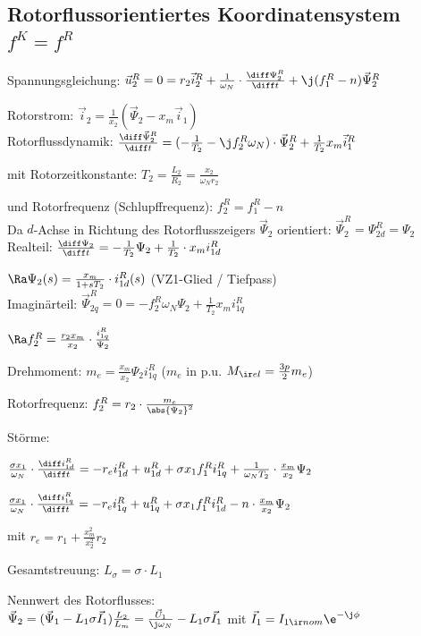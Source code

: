 \documentclass[german]{latex4ei_fs}
\begin{document}
\begin{sectionbox}
\subsection{Rotorflussorientiertes Koordinatensystem $f^K = f^R$}


Spannungsgleichung:
$\vec u_2^R = 0 = r_2 \vec i_2^R + \frac{1}{\omega_N} \cdot \frac{\diff \Psi_2^R}{\diff t} + \j (f_1^R - n) \vec \Psi_2^R$

Rotorstrom:
$\vec i_2 = \frac{1}{x_2} (\vec \Psi_2 - x_m \vec i_1)$ \\

Rotorflussdynamik:
$\frac{\diff \vec \Psi_2^R}{\diff t} = (- \frac{1}{T_2} - \j f_2^R \omega_N) \cdot \vec \Psi_2^R + \frac{1}{T_2} x_m \vec i_1^R$

mit Rotorzeitkonstante: $T_2 = \frac{L_2}{R_2} = \frac{x_2}{\omega_N r_2}$

und Rotorfrequenz (Schlupffrequenz): $f_2^R = f_1^R - n$ \\

Da $d$-Achse in Richtung des Rotorflusszeigers $\vec \Psi_2$ orientiert:
$\vec \Psi_2^R = \Psi_{2d}^R = \Psi_2$ \\

Realteil:
$\frac{\diff \Psi_2}{\diff t} = - \frac{1}{T_2} \Psi_2 + \frac{1}{T_2} \cdot x_m i_{1d}^R$

$\Ra \Psi_2(s) = \frac{x_m}{1 + s T_2} \cdot i_{1d}^R (s)$ (VZ1-Glied / Tiefpass) \\ 

Imaginärteil: 
$\vec \Psi_{2q}^R = 0 = - f_2^R \omega_N \Psi_2 + \frac{1}{T_2} x_m i_{1q}^R$

 $ \Ra f_2^R = \frac{r_2 x_m}{x_2} \cdot \frac{i_{1q}^R}{\Psi_2}$

 Drehmoment: $m_e = \frac{x_m}{x_2} \Psi_2 i_{1q}^R$ ($m_e$ in p.u. $M_{\ir el} = \frac{3p}{2} m_e$)

 Rotorfrequenz: $f_2^R = r_2 \cdot \frac{m_e}{\abs{\Psi_2}^2}$

Störme:

 $\frac{\sigma x_1}{\omega_N} \cdot \frac{\diff i_{1d}^R}{\diff t} = - r_e i_{1d}^R + u_{1d}^R + \sigma x_1 f_1^R i_{1q}^R + \frac{1}{\omega_N T_2} \cdot \frac{x_m}{x_2} \Psi_2$

  $\frac{\sigma x_1}{\omega_N} \cdot \frac{\diff i_{1q}^R}{\diff t} = - r_e i_{1q}^R + u_{1q}^R + \sigma x_1 f_1^R i_{1d}^R - n \cdot \frac{x_m}{x_2} \Psi_2$

  mit $r_e = r_1 + \frac{x_m^2}{x_2^2} r_2$

  Gesamtstreuung: $L_\sigma = \sigma \cdot L_1$

Nennwert des Rotorflusses: \\
$\vec \Psi_2 = (\vec \Psi_1 - L_1 \sigma \vec I_1) \frac{L_2}{L_m} = \frac{\vec U_1}{\j \omega_N} - L_1 \sigma \vec I_1$ mit $\vec I_1 = I_{1 \ir nom} \e^{-\j \phi}$

\end{sectionbox}
\end{document}
